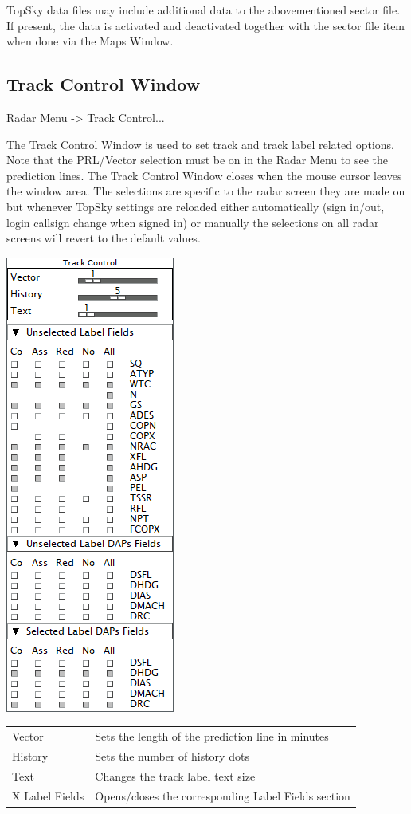 \documentclass[11pt,a4paper]{memoir}
\begin{document}
TopSky data files may include additional data to the abovementioned sector file. If present, the data is activated and deactivated together with the sector file item when done via the Maps Window.

\subsection{Track Control Window}
\label{win:tcw}

Radar Menu -> Track Control...

The Track Control Window is used to set track and track label related options. Note that the PRL/Vector selection must be on in the Radar Menu to see the prediction lines. The Track Control Window closes when the mouse cursor leaves the window area. The selections are specific to the radar screen they are made on but whenever TopSky settings are reloaded either automatically (sign in/out, login callsign change when signed in) or manually the selections on all radar screens will revert to the default values.

\includegraphics{img/trackctl.png}

\begin{tabular}{l l}
    Vector          & Sets the length of the prediction line in minutes\\
    History         & Sets the number of history dots\\
    Text            & Changes the track label text size\\
    X Label Fields  & Opens/closes the corresponding Label Fields section\\
\end{tabular}
\end{document}
